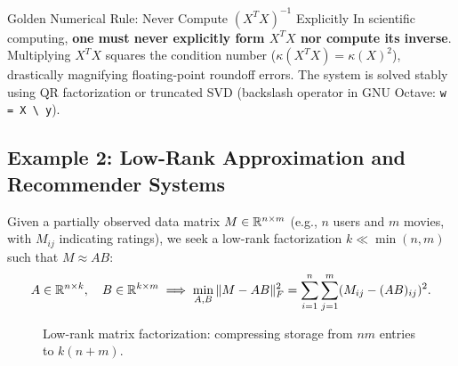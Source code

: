 \begin{alertblock}{Golden Numerical Rule: Never Compute $(X^T X)^{-1}$ Explicitly}
\label{rem:en:golden-rule-normal-equations}
In scientific computing, \textbf{one must never explicitly form $X^T X$ nor compute its inverse}. Multiplying $X^TX$ squares the condition number ($\kappa(X^T X) = \kappa(X)^2$), drastically magnifying floating-point roundoff errors. The system is solved stably using QR factorization or truncated SVD (backslash operator in GNU Octave: \texttt{w = X \textbackslash\ y}).
\end{alertblock}

\subsection{Example 2: Low-Rank Approximation and Recommender Systems}
Given a partially observed data matrix $M \in \mathbb{R}^{n \times m}$ (e.g., $n$ users and $m$ movies, with $M_{ij}$ indicating ratings), we seek a low-rank factorization $k \ll \min(n, m)$ such that $M \approx AB$:
\begin{equation}
    A \in \mathbb{R}^{n \times k}, \quad B \in \mathbb{R}^{k \times m} \implies \min_{A, B} \|M - AB\|_F^2 = \sum_{i=1}^n \sum_{j=1}^m (M_{ij} - (AB)_{ij})^2.
\end{equation}

\begin{figure}[H]
\centering
{}
\caption{Low-rank matrix factorization: compressing storage from $nm$ entries to $k(n + m)$.}
\label{fig:low-rank-matrix}
\end{figure}

